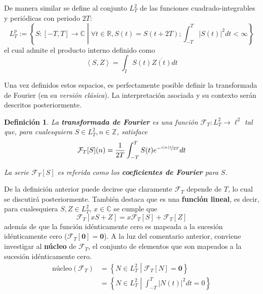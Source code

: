\documentclass[12pt,letterpaper]{book}
\newtheorem{definicion}{Definición}[chapter]
\newcommand{\R}{\mathbb{R}}
\newcommand{\C}{\mathbb{C}}
\newcommand{\Z}{\mathbb{Z}}
\newcommand{\simint}[1]{\int_{- #1 }^{ #1 }}
\newcommand{\abso}[1]{\left| #1 \right|}
\newcommand{\talque}{\mathrel{}\middle|\mathrel{}}
\begin{document}
De manera similar se define al conjunto $L^{2}_T$ de las funciones cuadrado-integrables y periódicas con periodo $2T$:
\begin{equation}
L^{p}_T := \left\{ S: [-T,T]\rightarrow\C \talque \forall t\in \R, S(t) = S(t+2T) ;  \int_{-T}^{T} \abso{S(t)}^{2} dt < \infty \right\}
\end{equation}
el cual admite el producto interno definido como
\begin{equation}
\left\langle S,Z \right\rangle = \int_I S(t) \overline{Z(t)} dt
\end{equation}

Una vez definidos estos espacios, es perfectamente posible definir la transformada de Fourier (en su \textit{versión clásica}). 
%
La interpretación asociada y su contexto serán descritos posteriormente.

\begin{definicion}
La \textbf{transformada de Fourier} es una función $\mathcal{F}_T : L^{2}_T \rightarrow \ell^{2}$ tal que, para cualesquiera $S\in L^{2}_T, n\in \Z$, satisface
\begin{equation}
\mathcal{F}_T[S](n) = \frac{1}{2 T} \simint{T} S(t) e^{-\nicefrac{ i \abso{n} t}{2T}} dt
\end{equation}

La serie $\mathcal{F}_T[S]$ es referida como los \textbf{coeficientes de Fourier} para $S$.
\end{definicion}

De la definición anterior puede decirse que claramente $\mathcal{F}_T$ depende de $T$, lo cual se discutirá posteriormente.
%
También destaca que es una \textbf{función lineal}, es decir, para cualesquiera $S, Z \in L^{2}_T$, $x\in \C$ se cumple que
\begin{equation}
\mathcal{F}_T[xS + Z] = x\mathcal{F}_T[S] + \mathcal{F}_T[Z]
\end{equation}
además de que la función idénticamente cero es mapeada a la sucesión idénticamente cero ($\mathcal{F}_T[\boldsymbol{0}]=\boldsymbol{0}$).
%
A la luz del comentario anterior, conviene investigar al \textbf{núcleo} de $\mathcal{F}_T$, el conjunto de elementos que son mapeados a la sucesión idénticamente cero.
%
\begin{align}
\text{núcleo}(\mathcal{F}_T) &= \left\{ N\in L^{2}_T \talque \mathcal{F}_T[N] = \boldsymbol{0}  \right\} \\
&= \left\{ N\in L^{2}_T \talque \simint{T} \abso{N(t)}^{2} dt = 0 \right\}
\end{align}
\end{document}
